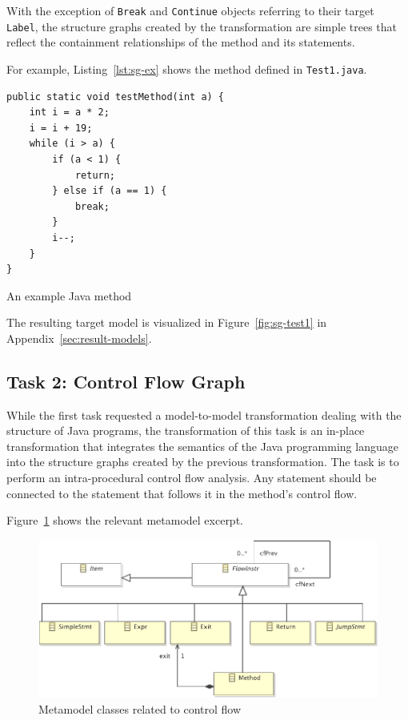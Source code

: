 \documentclass[10pt]{article}
\begin{document}
With the exception of \verb|Break| and \verb|Continue| objects referring to
their target \verb|Label|, the structure graphs created by the transformation
are simple trees that reflect the containment relationships of the method and
its statements.

For example, Listing~\ref{lst:sg-ex} shows the method defined in
\verb|Test1.java|.

\begin{listing}
  \begin{verbatim}
public static void testMethod(int a) {
    int i = a * 2;
    i = i + 19;
    while (i > a) {
        if (a < 1) {
            return;
        } else if (a == 1) {
            break;
        }
        i--;
    }
}
  \end{verbatim}
  \caption{An example Java method}
  \label{lst:sg-ex}
\end{listing}

The resulting target model is visualized in Figure~\ref{fig:sg-test1} in
Appendix~\ref{sec:result-models}.


\subsection{Task 2: Control Flow Graph}
\label{sec:task2-cf-graph}

While the first task requested a model-to-model transformation dealing with the
structure of Java programs, the transformation of this task is an in-place
transformation that integrates the semantics of the Java programming language
into the structure graphs created by the previous transformation.  The task is
to perform an intra-procedural control flow analysis.  Any statement should be
connected to the statement that follows it in the method's control flow.

Figure~\ref{fig:control-flow-mm} shows the relevant metamodel excerpt.

\begin{figure}[h!]
  \centering
  \includegraphics[width=0.8\linewidth]{../metamodel/ControlFlowGraph}
  \caption{Metamodel classes related to control flow}
  \label{fig:control-flow-mm}
\end{figure}
\end{document}
